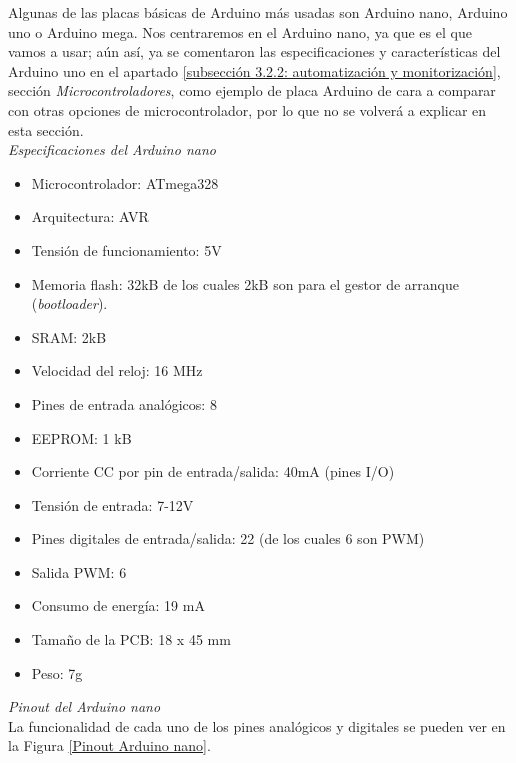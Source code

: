 \documentclass[12pt]{article}
\begin{document}
	\noindent Algunas de las placas básicas de Arduino más usadas son Arduino nano, Arduino uno o Arduino mega. Nos centraremos en el Arduino nano, ya que es el que vamos a usar; aún así, ya se comentaron las especificaciones y características del Arduino uno en el apartado \ref{subsección 3.2.2: automatización y monitorización}, sección \textit{Microcontroladores}, como ejemplo de placa Arduino de cara a comparar con otras opciones de microcontrolador, por lo que no se volverá a explicar en esta sección.  \\
	
	\noindent \textit{Especificaciones del Arduino nano} \\
	
	\begin{itemize}
		\item Microcontrolador: ATmega328
		\item Arquitectura: AVR
		\item Tensión de funcionamiento: 5V
		\item Memoria flash: 32kB de los cuales 2kB son para el gestor de arranque (\textit{bootloader}).
		\item SRAM: 2kB
		\item Velocidad del reloj: 16 MHz
		\item Pines de entrada analógicos: 8
		\item EEPROM: 1 kB
		\item Corriente CC por pin de entrada/salida: 40mA (pines I/O)
		\item Tensión de entrada: 7-12V
		\item Pines digitales de entrada/salida: 22 (de los cuales 6 son PWM)
		\item Salida PWM: 6
		\item Consumo de energía: 19 mA
		\item Tamaño de la PCB: 18 x 45 mm
		\item Peso: 7g
	\end{itemize}
	
	\noindent \textit{Pinout del Arduino nano} \\
	
	\noindent La funcionalidad de cada uno de los pines analógicos y digitales se pueden ver en la Figura \ref{Pinout Arduino nano}. \\
	
\end{document}
